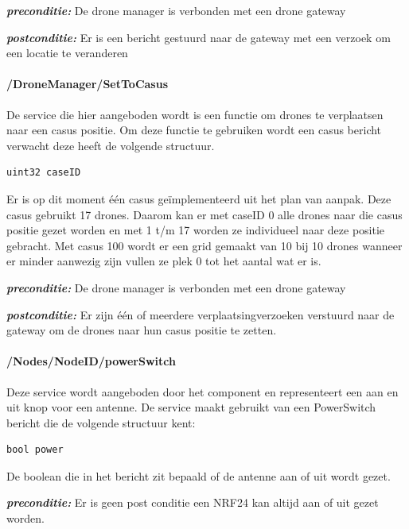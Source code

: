 \documentclass[a4paper, 11pt, oneside]{report}
\begin{document}
\textbf{\textit{preconditie:}} De drone manager is verbonden met een drone gateway 

\textbf{\textit{postconditie:}} Er is een bericht gestuurd naar de gateway met een verzoek om een locatie te veranderen

\paragraph{/DroneManager/SetToCasus}
\label{DetailedDesign:ros:extern:rosinterfaces:service:casus}
De service die hier aangeboden wordt is een functie om drones te verplaatsen naar een casus positie.
Om deze functie te gebruiken wordt een casus bericht verwacht deze heeft de volgende structuur.

\begin{lstlisting}
uint32 caseID
\end{lstlisting}

Er is op dit moment één casus geïmplementeerd uit het plan van aanpak.
Deze casus gebruikt 17 drones. 
Daarom kan er met caseID 0 alle drones naar die casus positie gezet worden en met 1 t/m 17 worden ze individueel naar deze positie gebracht.
Met casus 100 wordt er een grid gemaakt van 10 bij 10 drones wanneer er minder aanwezig zijn vullen ze plek 0 tot het aantal wat er is.   

\textbf{\textit{preconditie:}}  De drone manager is verbonden met een drone gateway 

\textbf{\textit{postconditie:}} Er zijn één of meerdere verplaatsingverzoeken verstuurd naar de gateway om de drones naar hun casus positie te zetten.

\paragraph{/Nodes/NodeID/powerSwitch}
\label{DetailedDesign:ros:extern:rosinterfaces:service:powerswitch}
Deze service wordt aangeboden door het component  en representeert een aan en uit knop voor een antenne.
De service maakt gebruikt van een PowerSwitch bericht die de volgende structuur kent:

\begin{lstlisting}
bool power
\end{lstlisting}

De boolean die in het bericht zit bepaald of de antenne aan of uit wordt gezet.

\textbf{\textit{preconditie:}}  Er is geen post conditie een NRF24 kan altijd aan of uit gezet worden.
\end{document}
